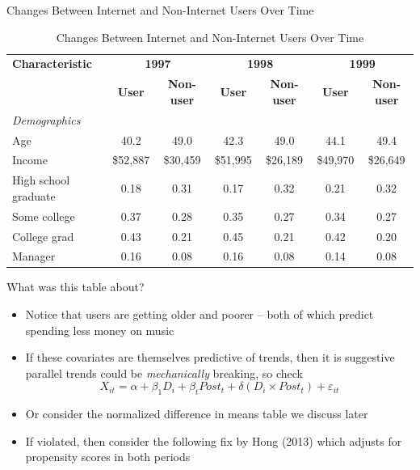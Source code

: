 \documentclass{beamer}
\begin{document}
\begin{frame}{Changes Between Internet and Non-Internet Users Over Time}
  \tiny
  \centering
  \begin{table}[htb]
    \caption{Changes Between Internet and Non-Internet Users Over Time}
    \begin{tabular}{lcccccc}
      \toprule
      \textbf{Characteristic} &
         \multicolumn{2}{c}{\textbf{1997}} &
         \multicolumn{2}{c}{\textbf{1998}} &
         \multicolumn{2}{c}{\textbf{1999}} \\
         & \textbf{User} & \textbf{Non-user} &
           \textbf{User} & \textbf{Non-user} &
           \textbf{User} & \textbf{Non-user} \\
      \midrule
      \emph{Demographics} \\
      Age & 40.2 & 49.0 & 42.3 & 49.0 & 44.1 & 49.4 \\
      Income & \$52,887 & \$30,459 & \$51,995 & \$26,189 & \$49,970 & \$26,649 \\
      High school graduate & 0.18 & 0.31 & 0.17 & 0.32 & 0.21 & 0.32 \\
      Some college & 0.37 & 0.28 & 0.35 & 0.27 & 0.34 & 0.27 \\
      College grad & 0.43 & 0.21 & 0.45 & 0.21 & 0.42 & 0.20 \\
      Manager & 0.16 & 0.08 & 0.16 & 0.08 & 0.14 & 0.08 \\
      \bottomrule
    \end{tabular}
  \end{table}
  

\end{frame}



\begin{frame}{What was this table about?}

\begin{itemize}
\item  Notice that users are getting older and poorer -- both of which predict spending less money on music
\item If these covariates are themselves predictive of trends, then it is suggestive parallel trends could be \emph{mechanically} breaking, so check $$X_{it} = \alpha + \beta_1 D_i + \beta_t Post_t + \delta ( D_i \times Post_t ) + \varepsilon_{it}$$ 
\item Or consider the normalized difference in means table we discuss later
\item If violated, then consider the following fix by Hong (2013) which adjusts for propensity scores in both periods
\end{itemize}

\end{frame}
\end{document}
